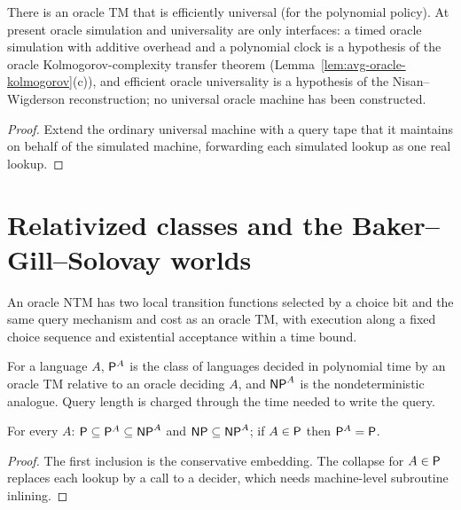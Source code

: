 \begin{theorem}
  \label{thm:barriers-universal-oracle-machine}
  There is an oracle TM that is efficiently universal (for the polynomial
  policy). At present oracle simulation and universality are only interfaces:
  a timed oracle simulation with additive overhead and a polynomial clock is a
  hypothesis of the oracle Kolmogorov-complexity transfer theorem
  (Lemma~\ref{lem:avg-oracle-kolmogorov}(c)), and
  efficient oracle universality is a hypothesis of the Nisan--Wigderson
  reconstruction; no universal oracle machine has been constructed.
\end{theorem}
\begin{proof}
  Extend the ordinary universal machine with a query tape that it maintains on
  behalf of the simulated machine, forwarding each simulated lookup as one real
  lookup.
\end{proof}

\section{Relativized classes and the Baker--Gill--Solovay worlds}

\begin{definition}
  \label{def:barriers-oracle-ntm}
  An oracle NTM has two local transition functions selected by a choice bit and
  the same query mechanism and cost as an oracle TM, with execution along a
  fixed choice sequence and existential acceptance within a time bound.
\end{definition}

\begin{definition}
  \label{def:barriers-relativized-classes}
  \notready
  For a language $A$, $\mathsf{P}^A$ is the class of languages decided in
  polynomial time by an oracle TM relative to an oracle deciding $A$, and
  $\mathsf{NP}^A$ is the nondeterministic analogue. Query length is charged through
  the time needed to write the query.
\end{definition}

\begin{proposition}
  \label{prop:barriers-relativizing-basics}
  \notready
  For every $A$: $\mathsf{P} \subseteq \mathsf{P}^A \subseteq \mathsf{NP}^A$ and
  $\mathsf{NP} \subseteq \mathsf{NP}^A$; if $A \in \mathsf{P}$ then $\mathsf{P}^A = \mathsf{P}$.
\end{proposition}
\begin{proof}
  The first inclusion is the conservative embedding. The collapse for
  $A \in \mathsf{P}$ replaces each lookup by a call to a decider, which needs
  machine-level subroutine inlining.
\end{proof}

